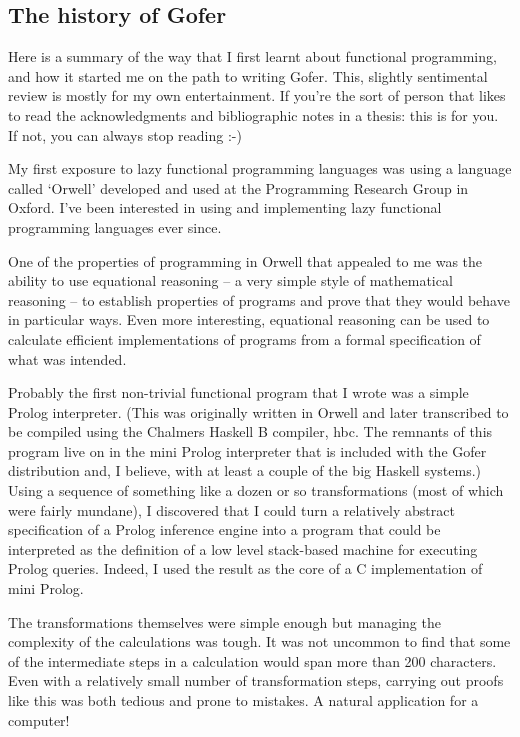 \subsection{The history of Gofer}
Here is a summary of the way that I first learnt about functional
programming, and how it started me on the path to writing Gofer.
This, slightly sentimental review is mostly for my own entertainment.
If you're the sort of person that likes to read the acknowledgments
and bibliographic notes in a thesis: this is for you.  If not, you
can always stop reading :-)

My first exposure to lazy functional programming languages was using a
language called `Orwell' developed and used at the Programming Research
Group in Oxford.  I've been interested in using and implementing lazy
functional programming languages ever since.

One of the properties of programming in Orwell that appealed to me was
the ability to use equational reasoning -- a very simple style of
mathematical reasoning -- to establish properties of programs and prove
that they would behave in particular ways.  Even more interesting,
equational reasoning can be used to calculate efficient implementations
of programs from a formal specification of what was intended.

Probably the first non-trivial functional program that I wrote was a
simple Prolog interpreter.  (This was originally written in Orwell and
later transcribed to be compiled using the Chalmers Haskell B compiler,
hbc.  The remnants of this program live on in the mini Prolog
interpreter that is included with the Gofer distribution and, I
believe, with at least a couple of the big Haskell systems.) Using a
sequence of something like a dozen or so transformations (most of which
were fairly mundane), I discovered that I could turn a relatively
abstract specification of a Prolog inference engine into a program that
could be interpreted as the definition of a low level stack-based
machine for executing Prolog queries.  Indeed, I used the result as the
core of a C implementation of mini Prolog.

The transformations themselves were simple enough but managing the
complexity of the calculations was tough.  It was not uncommon to find
that some of the intermediate steps in a calculation would span more
than 200 characters.  Even with a relatively small number of
transformation steps, carrying out proofs like this was both tedious
and prone to mistakes.  A natural application for a computer!

